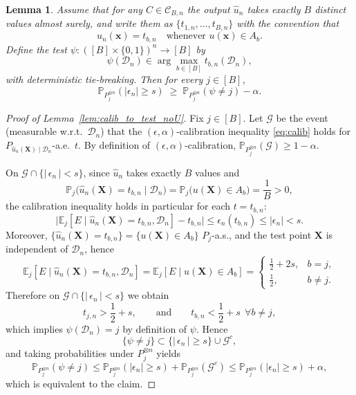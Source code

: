 \documentclass{article}
\theoremstyle{plain}
\newtheorem{lemma}[theorem]{Lemma}
\theoremstyle{definition}
\theoremstyle{remark}
\begin{document}
\begin{lemma}
\label{lem:calib_to_test_simple}
Assume that for any $C\in\mathcal C_{B,n}$ the output $\widehat u_n$ takes exactly $B$ distinct
values almost surely, and write them as $\{t_{1,n},\dots,t_{B,n}\}$ with the convention that
\[
\widehat u_n(\mathbf x)=t_{b,n}\quad\text{whenever }u(\mathbf x)\in A_b.
\]
Define the test $\psi:([B]\times\{0,1\})^n\to[B]$ by
\[
\psi(\mathcal D_n)\in\arg\max_{b\in[B]} t_{b,n}(\mathcal D_n),
\]
with deterministic tie-breaking. Then for every $j\in[B]$,
\[
\mathbb P_{P_j^{\otimes n}}\!\left(|\epsilon_n|\ge s\right)
\;\ge\;
\mathbb P_{P_j^{\otimes n}}(\psi\neq j)-\alpha.
\]
\end{lemma}
\begin{proof}[Proof of Lemma~\ref{lem:calib_to_test_noU}]
Fix $j\in[B]$. Let $\mathcal G$ be the event (measurable w.r.t.\ $\mathcal D_n$) that the
$(\epsilon,\alpha)$-calibration inequality \eqref{eq:calib} holds for
$P_{\widehat u_n(\mathbf X)\mid \mathcal D_n}$-a.e.\ $t$.
By definition of $(\epsilon,\alpha)$-calibration, $\mathbb P_{P_j^{\otimes n}}(\mathcal G)\ge 1-\alpha$.

On $\mathcal G\cap\{|\,\epsilon_n\,|<s\}$, since $\widehat u_n$ takes exactly $B$ values and
\[
\mathbb P_j\!\big(\widehat u_n(\mathbf X)=t_{b,n}\mid\mathcal D_n\big)
=
\mathbb P_j\!\big(u(\mathbf X)\in A_b\big)
=
\frac1B>0,
\]
the calibration inequality holds in particular for each $t=t_{b,n}$:
\[
\big|\mathbb E_j[E\mid \widehat u_n(\mathbf X)=t_{b,n},\mathcal D_n]-t_{b,n}\big|
\le \epsilon_n(t_{b,n})\le |\epsilon_n|<s.
\]
Moreover, $\{\widehat u_n(\mathbf X)=t_{b,n}\}=\{u(\mathbf X)\in A_b\}$ $P_j$-a.s., and the test point
$\mathbf X$ is independent of $\mathcal D_n$, hence
\[
\mathbb E_j[E\mid \widehat u_n(\mathbf X)=t_{b,n},\mathcal D_n]
=
\mathbb E_j[E\mid u(\mathbf X)\in A_b]
=
\begin{cases}
\frac12+2s,& b=j,\\[2pt]
\frac12,& b\neq j.
\end{cases}
\]
Therefore on $\mathcal G\cap\{|\,\epsilon_n\,|<s\}$ we obtain
\[
t_{j,n}>\frac12+s,\qquad\text{and}\qquad t_{b,n}<\frac12+s\ \ \forall b\neq j,
\]
which implies $\psi(\mathcal D_n)=j$ by definition of $\psi$.
Hence
\[
\{\psi\neq j\}\subset \{|\,\epsilon_n\,|\ge s\}\cup \mathcal G^c,
\]
and taking probabilities under $P_j^{\otimes n}$ yields
\[
\mathbb P_{P_j^{\otimes n}}(\psi\neq j)
\le
\mathbb P_{P_j^{\otimes n}}(|\epsilon_n|\ge s)+\mathbb P_{P_j^{\otimes n}}(\mathcal G^c)
\le
\mathbb P_{P_j^{\otimes n}}(|\epsilon_n|\ge s)+\alpha,
\]
which is equivalent to the claim.
\end{proof}
\end{document}
